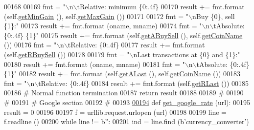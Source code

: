 \begin{DoxyCode}
00168         
00169         fmt = \textcolor{stringliteral}{"\(\backslash\)n\(\backslash\)tRelative: minimum \{0:.4f\} %
00170         result += fmt.format (self.\hyperlink{classexch2exch_1_1_differences_a110cb3a79f744b6d3911b6669b8a0a89}{getMinGain} (), self.\hyperlink{classexch2exch_1_1_differences_a3b557469ba68c3041d6ef04dc847c77b}{getMaxGain} ())
00171         
00172         fmt = \textcolor{stringliteral}{"\(\backslash\)nBuy \{0\}, sell \{1\}:"}
00173         result += fmt.format (oname, mname)
00174         fmt = \textcolor{stringliteral}{"\(\backslash\)n\(\backslash\)tAbsolute: \{0:.4f\} \{1\}"}
00175         result += fmt.format (self.\hyperlink{classexch2exch_1_1_differences_a5b1000fb221e0726fb36a8e9a0655d84}{getABuySell} (), self.\hyperlink{classexch2exch_1_1_differences_a27c3904cedfe6f58d750591c1f7c7879}{getCoinName} ())
00176         fmt = \textcolor{stringliteral}{"\(\backslash\)n\(\backslash\)tRelative: \{0:.4f\} %
00177         result += fmt.format (self.\hyperlink{classexch2exch_1_1_differences_ae360dc9692075e21d0aafa2ff1dc23d4}{getRBuySell} ())
00178         
00179         fmt = \textcolor{stringliteral}{"\(\backslash\)nLast transactions at \{0\} and \{1\}:"}
00180         result += fmt.format (oname, mname)
00181         fmt = \textcolor{stringliteral}{"\(\backslash\)n\(\backslash\)tAbsolute: \{0:.4f\} \{1\}"}
00182         result += fmt.format (self.\hyperlink{classexch2exch_1_1_differences_ae65d1f91ffad5d587a564d7160263b83}{getALast} (), self.\hyperlink{classexch2exch_1_1_differences_a27c3904cedfe6f58d750591c1f7c7879}{getCoinName} ())
00183         fmt = \textcolor{stringliteral}{"\(\backslash\)n\(\backslash\)tRelative: \{0:.4f\} %
00184         result += fmt.format (self.\hyperlink{classexch2exch_1_1_differences_ac4f1f695ff394d65cfb51ea55dc67fa5}{getRLast} ())
00185         
00186         \textcolor{comment}{# Normal function termination}
00187         \textcolor{keywordflow}{return} result
00188 
00189 \textcolor{comment}{#        }
00190 \textcolor{comment}{# }
00191 \textcolor{comment}{# Google section }
00192 \textcolor{comment}{#}
00193 
\hyperlink{namespaceexch2exch_a20ad08d045d52bdcb3977eaa8f951622}{00194} \textcolor{keyword}{def }\hyperlink{namespaceexch2exch_a20ad08d045d52bdcb3977eaa8f951622}{get\_google\_rate} (url):
00195     result = 0
00196 
00197     f = urllib.request.urlopen (url)
00198     
00199     line = f.readline ()
00200     \textcolor{keywordflow}{while} line != b\textcolor{stringliteral}{''}:
00201         ind = line.find (b\textcolor{stringliteral}{'currency\_converter'})
}}}
\end{DoxyCode}
